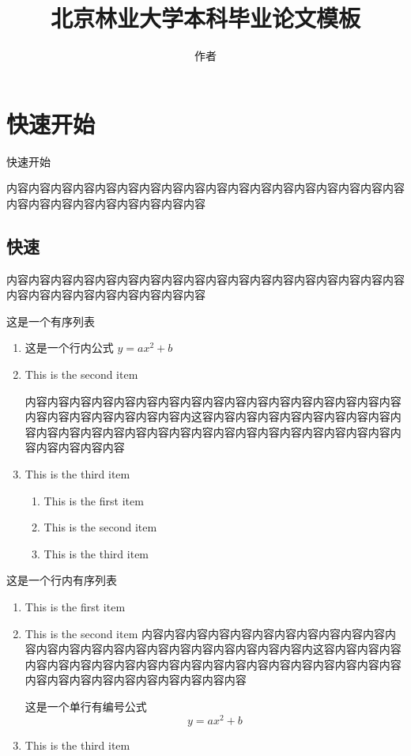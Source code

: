 \documentclass{bjfu}
\title{北京林业大学本科毕业论文模板}
\author{作者}
\begin{document}
\makeBjfuTitlePage

\section{快速开始}
快速开始 \cite{刘海洋2013LATEX}

内容内容内容内容内容内容内容内容内容内容内容内容内容内容内容内容内容内容内容内容内容内容内容内容内容内容内容

\subsection{快速}

内容内容内容内容内容内容内容内容内容内容内容内容内容内容内容内容内容内容内容内容内容内容内容内容内容内容内容

这是一个有序列表

\begin{enumerate}[labelsep = .5em, leftmargin = 0pt, itemindent = 3em]
    \item 这是一个行内公式 $y = ax^2+b$
    
    \item This is the second item %
    
    \setlength{\parindent}{2em}内容内容内容内容内容内容内容内容内容内容内容内容内容内容内容内容内容内容内容内容内容内容内容内容内这容内容内容内容内容内容内容内容内容内容内容内容内容内容内容内容内容内容内容内容内容内容内容内容内容内容内容内容内容内容内容
    \item This is the third item 
    
    \begin{enumerate}[itemindent=2em]
        \item This is the first item
        \item This is the second item
        \item This is the third item
    \end{enumerate}
\end{enumerate}


这是一个行内有序列表
\begin{enumerate}[fullwidth,itemindent=2em]
    \item This is the first item
    \item This is the second item 内容内容内容内容内容内容内容内容内容内容内容内容内容内容内容内容内容内容内容内容内容内容内容内容内这容内容内容内容内容内容内容内容内容内容内容内容内容内容内容内容内容内容内容内容内容内容内容内容内容内容内容内容内容内容内容
    
    这是一个单行有编号公式
    \begin{equation}
    y=ax^2+b
    \end{equation}
    \item This is the third item 
\end{enumerate}
\end{document}
